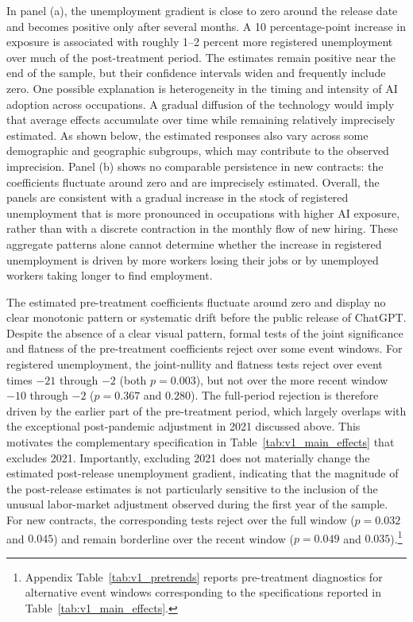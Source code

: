 \documentclass[11pt]{article}
\begin{document}
In panel (a), the unemployment gradient is close to zero around the release date and becomes positive only after several months. A 10 percentage-point increase in exposure is associated with roughly 1--2 percent more registered unemployment over much of the post-treatment period. The estimates remain positive near the end of the sample, but their confidence intervals widen and frequently include zero. One possible explanation is heterogeneity in the timing and intensity of AI adoption across occupations. A gradual diffusion of the technology would imply that average effects accumulate over time while remaining relatively imprecisely estimated. As shown below, the estimated responses also vary across some demographic and geographic subgroups, which may contribute to the observed imprecision. Panel (b) shows no comparable persistence in new contracts: the coefficients fluctuate around zero and are imprecisely estimated. Overall, the panels are consistent with a gradual increase in the stock of registered unemployment that is more pronounced in occupations with higher AI exposure, rather than with a discrete contraction in the monthly flow of new hiring. These aggregate patterns alone cannot determine whether the increase in registered unemployment is driven by more workers losing their jobs or by unemployed workers taking longer to find employment.

The estimated pre-treatment coefficients fluctuate around zero and display no clear monotonic pattern or systematic drift before the public release of ChatGPT. Despite the absence of a clear visual pattern, formal tests of the joint significance and flatness of the pre-treatment coefficients reject over some event windows. For registered unemployment, the joint-nullity and flatness tests reject over event times \(-21\) through \(-2\) (both \(p=0.003\)), but not over the more recent window \(-10\) through \(-2\) (\(p=0.367\) and \(0.280\)). The full-period rejection is therefore driven by the earlier part of the pre-treatment period, which largely overlaps with the exceptional post-pandemic adjustment in 2021 discussed above. This motivates the complementary specification in Table~\ref{tab:v1_main_effects} that excludes 2021. Importantly, excluding 2021 does not materially change the estimated post-release unemployment gradient, indicating that the magnitude of the post-release estimates is not particularly sensitive to the inclusion of the unusual labor-market adjustment observed during the first year of the sample. For new contracts, the corresponding tests reject over the full window (\(p=0.032\) and \(0.045\)) and remain borderline over the recent window (\(p=0.049\) and \(0.035\)).\footnote{Appendix Table~\ref{tab:v1_pretrends} reports pre-treatment diagnostics for alternative event windows corresponding to the specifications reported in Table~\ref{tab:v1_main_effects}.}
\end{document}
